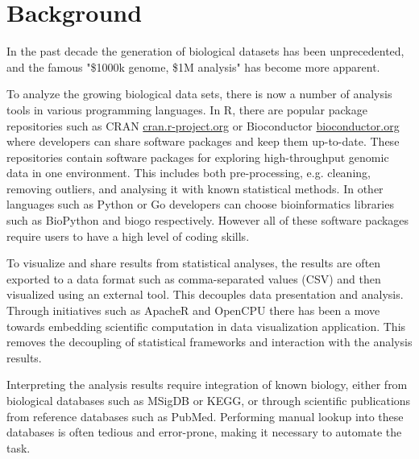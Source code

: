 \section*{Background}

In the past decade the generation of biological datasets has been unprecedented,
and the famous "\$1000k genome, \$1M analysis"\cite{} has become more apparent.


To analyze the growing biological data sets, there is now a number of analysis
tools in various programming languages.\cite{} In R, there are popular package
repositories such as CRAN \url{cran.r-project.org} or Bioconductor
\url{bioconductor.org} where developers can share software packages and keep
them up-to-date.  These repositories contain software packages for exploring
high-throughput genomic data in one environment. This includes both
pre-processing, e.g. cleaning, removing outliers, and analysing it with known
statistical methods. In other languages such as Python or Go developers can
choose bioinformatics libraries such as BioPython\cite{} and biogo\cite{}
respectively.  However all of these software packages require users to have a
high level of coding skills. 

To visualize and share results from statistical analyses, the results are often
exported to a data format such as comma-separated values (CSV) and
then visualized using an external tool. This decouples data presentation and
analysis.  Through initiatives such as ApacheR and OpenCPU there has been a move
towards embedding scientific computation in data visualization application. This
removes the decoupling of statistical frameworks and interaction with the
analysis results. 

Interpreting the analysis results require integration of known biology, either
from biological databases such as MSigDB\cite{} or KEGG\cite{}, or through
scientific publications from reference databases such as PubMed\cite{}.
Performing manual lookup into these databases is often tedious and error-prone,
making it necessary to automate the task. 

